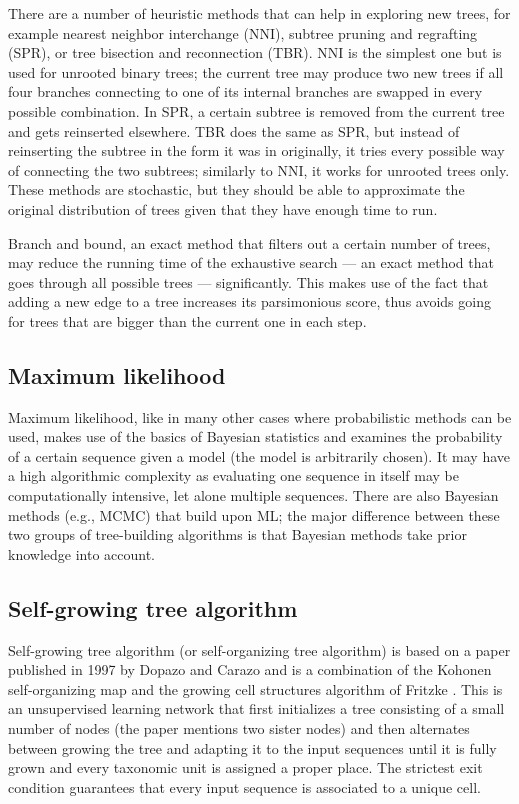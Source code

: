 \documentclass[11pt,twocolumn]{article}
\begin{document}
There are a number of heuristic methods that can help in exploring new trees, for example nearest neighbor interchange (NNI), subtree pruning and regrafting (SPR), or tree bisection and reconnection (TBR). NNI is the simplest one but is used for unrooted binary trees; the current tree may produce two new trees if all four branches connecting to one of its internal branches are swapped in every possible combination. In SPR, a certain subtree is removed from the current tree and gets reinserted elsewhere. TBR does the same as SPR, but instead of reinserting the subtree in the form it was in originally, it tries every possible way of connecting the two subtrees; similarly to NNI, it works for unrooted trees only. These methods are stochastic, but they should be able to approximate the original distribution of trees given that they have enough time to run.

Branch and bound, an exact method that filters out a certain number of trees, may reduce the running time of the exhaustive search — an exact method that goes through all possible trees — significantly. This makes use of the fact that adding a new edge to a tree increases its parsimonious score, thus avoids going for trees that are bigger than the current one in each step.

\subsection{Maximum likelihood}

Maximum likelihood, like in many other cases where probabilistic methods can be used, makes use of the basics of Bayesian statistics and examines the probability of a certain sequence given a model (the model is arbitrarily chosen). It may have a high algorithmic complexity as evaluating one sequence in itself may be computationally intensive, let alone multiple sequences. There are also Bayesian methods (e.g., MCMC) that build upon ML; the major difference between these two groups of tree-building algorithms is that Bayesian methods take prior knowledge into account.

\subsection{Self-growing tree algorithm}

Self-growing tree algorithm (or self-organizing tree algorithm) is based on a paper published in 1997 by Dopazo and Carazo \cite{Dopazo1997} and is a combination of the Kohonen self-organizing map \cite{58325} and the growing cell structures algorithm of Fritzke \cite{Fritzke1994}. This is an unsupervised learning network that first initializes a tree consisting of a small number of nodes (the paper mentions two sister nodes) and then alternates between growing the tree and adapting it to the input sequences until it is fully grown and every taxonomic unit is assigned a proper place. The strictest exit condition guarantees that every input sequence is associated to a unique cell.
\end{document}
